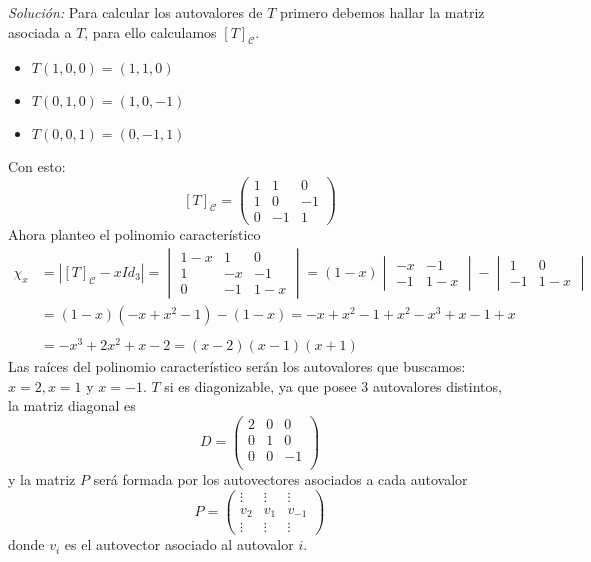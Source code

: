 \documentclass{article}
\newenvironment{solution}
    {\textit{Solución:}}
    {}
\begin{document}
\begin{solution}
    Para calcular los autovalores de $T$ primero debemos hallar la matriz asociada a $T$, para ello calculamos $[T]_{\mathcal{C}}$.
\begin{itemize}
\item 
$T(1,0,0) = (1,1,0)$
\item 
$T(0,1,0)=(1,0,-1)$
\item 
$T(0,0,1)=(0,-1,1)$
\end{itemize}

Con esto:
\[
[T]_{\mathcal{C}} = 
\begin{pmatrix}
1 & 1 & 0 \\
1 & 0 & -1 \\
0 & -1 & 1
\end{pmatrix}
\]
Ahora planteo el polinomio característico
\[
\begin{aligned}
\chi_x &= |[T]_{\mathcal{C}}-xId_3| =
\begin{vmatrix}
1-x & 1 & 0 \\
1 & -x & -1 \\
0 & -1 & 1-x
\end{vmatrix}=(1-x)
\begin{vmatrix}
-x & -1 \\
-1 & 1-x
\end{vmatrix} - 
\begin{vmatrix}
1 & 0 \\
-1 & 1-x
\end{vmatrix} \\
&= (1-x)(-x+x^2-1)-(1-x) = -x+x^2-1+x^2-x^3+x -1+x \\ \\
&= -x^3+2x^2+x-2 = (x-2)(x-1)(x+1)
\end{aligned}
\]
Las raíces del polinomio característico serán los autovalores que buscamos: $x=2,x=1$ y $x=-1$.
$T$ si es diagonizable, ya que posee $3$ autovalores distintos, la matriz diagonal es
\[
D = \begin{pmatrix}
2 & 0 & 0  \\
0 & 1 & 0 \\
0 & 0 & -1 \\
\end{pmatrix}
\]
y la matriz $P$ será formada por los autovectores asociados a cada autovalor
\[
P = \begin{pmatrix}
\vdots & \vdots & \vdots \\
v_2 & v_1 & v_{-1} \\
\vdots & \vdots & \vdots
\end{pmatrix}
\]
donde $v_i$ es el autovector asociado al autovalor $i$.
\end{solution}
\end{document}
